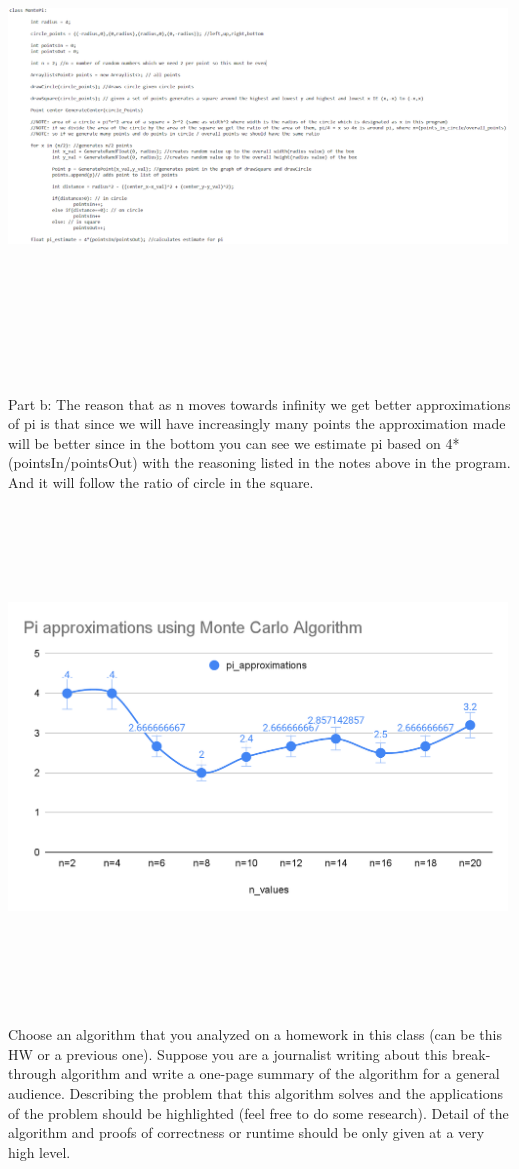 \documentclass{article}
\begin{document}
\includegraphics[width=500,height=500,keepaspectratio]{q2Code.png}

Part b:
The reason that as n moves towards infinity we get better approximations of pi is that since we will have increasingly many points the approximation made will be better since in the bottom you can see we estimate pi based on 4*(pointsIn/pointsOut) with the reasoning listed in the notes above in the program. And it will follow the ratio of circle in the square.

\includegraphics[width=500,height=500,keepaspectratio]{piCalcGraph.png}

\collab{}
\nextprob{}

Choose an algorithm that you analyzed on a homework in this class (can be this
HW or a previous one).  Suppose you are a journalist writing about this
break-through algorithm and write a one-page summary of the algorithm for a
general audience.  Describing the problem that this algorithm solves and the
applications of the problem should be highlighted (feel free to do some
research).  Detail of the algorithm and proofs of correctness or runtime should
be only given at a very high level.
\end{document}
